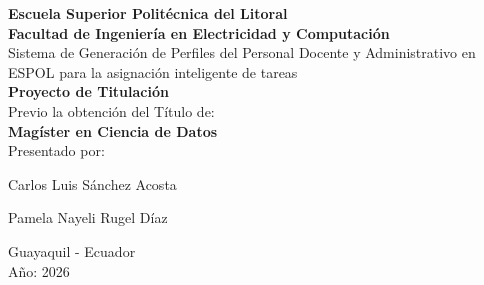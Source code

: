 \begin{titlepage}

\newcommand{\HRule}{\rule{\linewidth}{0.5mm}} %

\center %
 
{\fontsize{16}{20}\selectfont \textbf{Escuela Superior Polit\'ecnica del Litoral}}
\\[3.0em]
{\fontsize{16}{20}\selectfont \textbf{Facultad de Ingenier\'ia en Electricidad y Computaci\'on}}\\[3.0em]


{\fontsize{14}{18}\selectfont  Sistema de Generación de Perfiles del Personal Docente y Administrativo en ESPOL para la asignación inteligente de tareas}\\[3.0em]
{\fontsize{16}{20}\selectfont \textbf{Proyecto de Titulación}}\\[1.5em] 
{\fontsize{16}{20}\selectfont Previo la obtenci\'on del T\'itulo de:}\\[1.5em] 
{\fontsize{16}{20}\selectfont \textbf{Magíster en Ciencia de Datos}}\\[3.5em] 

{\fontsize{16}{20}\selectfont Presentado por:}\\[1.5em]
\author{Nombres1 y Apellidos1} {\fontsize{16}{20}\selectfont  Carlos Luis Sánchez Acosta}\\[1.5em]
\author{Nombres2 y Apellidos2} {\fontsize{16}{20}\selectfont Pamela Nayeli Rugel D\'iaz}

\vspace{3.0em} %
{\fontsize{16}{20}\selectfont Guayaquil - Ecuador}\\[1.5em]
{\fontsize{16}{20}\selectfont A\~no: 2026}

\thispagestyle{empty}
\end{titlepage}